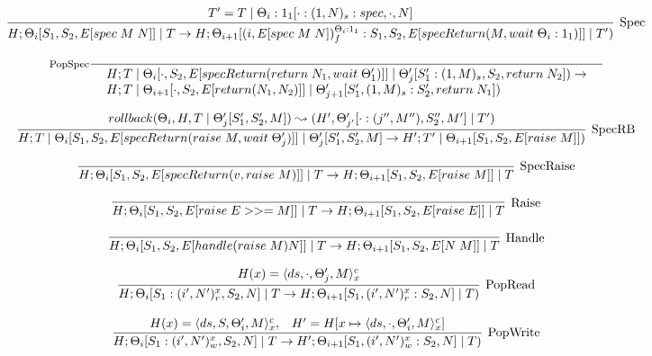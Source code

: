 \documentclass[9pt]{article}
\newcommand{\eval}[1]{E[#1]}
\begin{document}
\[ %
\infer[\text{Spec}]{H; \Theta_i[S_1, S_2, \eval{spec \; M \; N}] \; | \; T \rightarrow H; \Theta_{i+1}[(i, \eval{spec \; M \; N})_f^{\Theta_i : 1_1} : S_1, S_2, \eval{specReturn(M, wait \; \Theta_i : 1_1)}] \; | \; T')}{T' = T \; | \; \Theta_i : 1_1[\cdot : (1, N)_s : spec, \cdot, N]}
\]

\[%
\inference[\text{PopSpec}]{}{\begin{array}{l} H; T \; | \; \Theta_i[\cdot, S_2, \eval{specReturn(return \; N_1, wait \; \Theta_1')}] \; | \; \Theta_j'[S_1' : (1, M)_s, S_2, return \; N_2]) \rightarrow \\ H; T \; | \; \Theta_{i+1}[\cdot, S_2, \eval{return(N_1, N_2)}] \; | \; \Theta_{j+1}'[S_1', (1, M)_s : S_2', return \; N_1]) \end{array}}
\]


\[%
\infer[\text{SpecRB}]{H; T \; | \; \Theta_i[S_1, S_2, \eval{specReturn(raise \; M, wait \; \Theta_j')}] \; | \; \Theta_j'[S_1', S_2', M] \rightarrow H'; T' \; | \;  \Theta_{i+1}[S_1, S_2, \eval{raise \; M}])}{rollback(\Theta_i, H, T \; | \; \Theta_j'[S_1', S_2', M]) \leadsto (H', \Theta_{j'}'[\cdot : (j'', M''), S_2'', M'] \; | \; T')}
\]

\[%
\infer[\text{SpecRaise}]{H; \Theta_i[S_1, S_2, \eval{specReturn(v, raise \; M)}] \; | \; T \rightarrow H; \Theta_{i+1}[S_1, S_2, \eval{raise \; M}] \; | \; T}{}
\]

\[%
\infer[\text{Raise}]{H; \Theta_i[S_1, S_2, \eval{raise \; E >>= M}] \; | \; T \rightarrow H; \Theta_{i+1}[S_1, S_2, \eval{raise \; E}] \; | \; T}{}
\]

\[%
\infer[\text{Handle}]{H; \Theta_i[S_1, S_2, \eval{handle (raise \; M) N}] \; | \; T \rightarrow H; \Theta_{i+1}[S_1, S_2, \eval{N \; M}] \; | \; T}{}
\]

\[%
\infer[\text{PopRead}]{H; \Theta_i[S_1 : (i', N')_r^x, S_2, N] \; | \; T \rightarrow H; \Theta_{i+1}[S_1, (i', N')_r^x : S_2, N] \; | \; T)}{H(x) = \langle ds, \cdot, \Theta_j', M\rangle_x^c}
\]

\[%
\infer[\text{PopWrite}]{H; \Theta_i[S_1: (i', N')_w^x, S_2, N] \; | \; T \rightarrow H'; \Theta_{i+1}[S_1, (i', N')_w^x : S_2, N] \; | \; T)}{H(x) = \langle ds, S, \Theta_i', M\rangle_x^c, \;\;\; H' = H[x \mapsto \langle ds, \cdot, \Theta_i', M\rangle_x^c]}
\]
\end{document}
